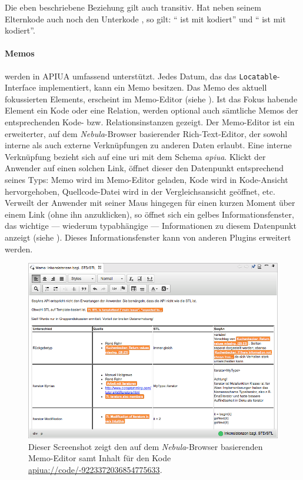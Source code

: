 Die eben beschriebene Beziehung gilt auch transitiv. Hat  neben seinem Elternkode  auch noch den Unterkode , so gilt: `` ist mit  kodiert'' und `` ist mit  kodiert''.

\paragraph{Memos} werden in APIUA umfassend unterstützt. Jedes Datum, das das \texttt{Locatable}-Interface implementiert, kann ein Memo besitzen. Das Memo des aktuell fokussierten Elements, erscheint im Memo-Editor (siehe ). Ist das Fokus habende Element ein Kode oder eine Relation, werden optional auch sämtliche Memos der entsprechenden Kode- bzw. Relationsinstanzen gezeigt. Der Memo-Editor ist ein erweiterter, auf dem \textit{Nebula}-Browser basierender Rich-Text-Editor, der sowohl interne als auch externe Verknüpfungen zu anderen Daten erlaubt. Eine interne Verknüpfung bezieht sich auf eine \gls{uri} mit dem Schema \textit{apiua}. Klickt der Anwender auf einen solchen Link, öffnet dieser den Datenpunkt entsprechend seines Typs: Memo wird im Memo-Editor geladen, Kode wird in Kode-Ansicht hervorgehoben, Quellcode-Datei wird in der Vergleichsansicht geöffnet, etc. Verweilt der Anwender mit seiner Maus hingegen für einen kurzen Moment über einem Link (ohne ihn anzuklicken), so öffnet sich ein gelbes Informationsfenster, das wichtige --- wiederum typabhängige --- Informationen zu diesem Datenpunkt anzeigt (siehe ). Dieses Informationsfenster kann von anderen Plugins erweitert werden.

\begin{figure}
  \centering
    \includegraphics[width=0.8\linewidth]{Figures/apiua/memos.png}
  \caption[APIUA: Memo-Editor]{Dieser Screenshot zeigt den auf dem \textit{Nebula}-Browser basierenden Memo-Editor samt Inhalt für den Kode \url{apiua://code/-9223372036854775633}.}
  \label{fig:apiua-memos}
\end{figure}

